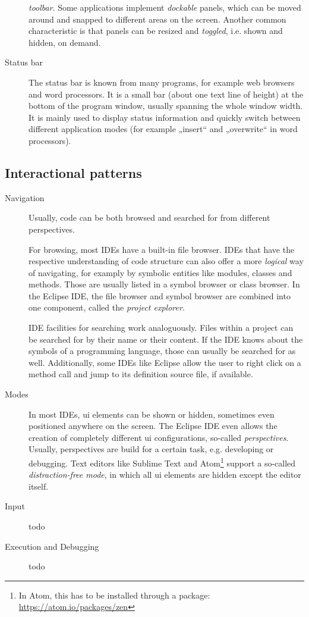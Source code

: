 \begin{description}
\emph{toolbar}. Some applications implement \emph{dockable} panels,
which can be moved around and snapped to different areas on the screen.
Another common characteristic is that panels can be resized and
\emph{toggled}, i.e. shown and hidden, on demand.
\item[Status bar]
The status bar is known from many programs, for example web browsers and
word processors. It is a small bar (about one text line of height) at
the bottom of the program window, usually spanning the whole window
width. It is mainly used to display status information and quickly
switch between different application modes (for example „insert“ and
„overwrite“ in word processors).
\end{description}

\subsection{Interactional patterns}\label{interactional-patterns}

\begin{description}
\item[Navigation]
Usually, code can be both browsed and searched for from different
perspectives.

For browsing, most IDEs have a built-in file browser. IDEs that have the
respective understanding of code structure can also offer a more
\emph{logical} way of navigating, for examply by symbolic entities like
modules, classes and methods. Those are usually listed in a symbol
browser or class browser. In the Eclipse IDE, the file browser and
symbol browser are combined into one component, called the \emph{project
explorer}.

IDE facilities for searching work analoguously. Files within a project
can be searched for by their name or their content. If the IDE knows
about the symbols of a programming language, those can usually be
searched for as well. Additionally, some IDEs like Eclipse allow the
user to right click on a method call and jump to its definition source
file, if available.
\item[Modes]
In most IDEs, \ac{ui} elements can be shown or hidden, sometimes even
positioned anywhere on the screen. The Eclipse IDE even allows the
creation of completely different \ac{ui} configurations, so-called
\emph{perspectives}. Usually, perspectives are build for a certain task,
e.g. developing or debugging. Text editors like Sublime Text and
Atom\footnote{In Atom, this has to be installed through a package: \url{https://atom.io/packages/zen}}
support a so-called \emph{distraction-free mode}, in which all \acl{ui}
elements are hidden except the editor itself.
\item[Input]
todo
\item[Execution and Debugging]
todo
\end{description}

